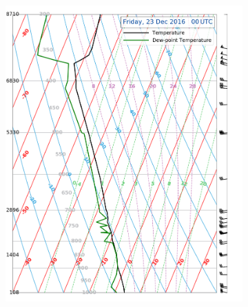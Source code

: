 \begin{landscape}
\begin{figure}
\begin{subfigure}[b]{0.66\textheight}
			\includegraphics[trim={0cm 0.2cm 2.5cm .5cm},clip,
			width=\textwidth]{./fig_Sounding/20161223_00Z}
			\caption{}\label{fig:Soun23}
		\end{subfigure}
	\end{figure}
	

\end{landscape}

